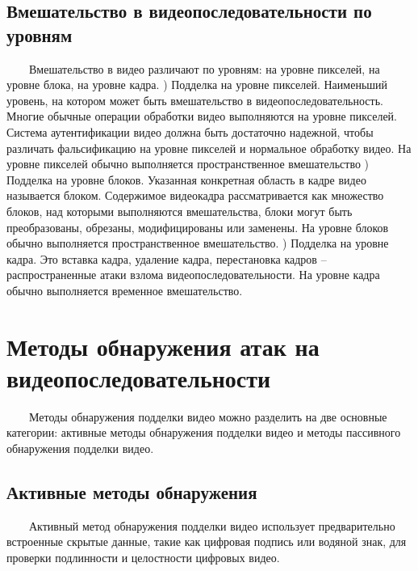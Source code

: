 \documentclass[12pt]{article}
\begin{document}
    \subsection{Вмешательство в видеопоследовательности по уровням}
        $\qquad$Вмешательство в видео различают по уровням: на уровне пикселей, на уровне блока, на уровне кадра.
        )      Подделка на уровне пикселей. Наименьший уровень, на котором может быть вмешательство в видеопоследовательность. Многие обычные операции обработки видео выполняются на уровне пикселей. Система аутентификации видео должна быть достаточно надежной, чтобы различать фальсификацию на уровне пикселей и нормальное обработку видео. На уровне пикселей обычно выполняется пространственное вмешательство
        )      Подделка на уровне блоков. Указанная конкретная область в кадре видео называется блоком. Содержимое видеокадра рассматривается как множество блоков, над которыми выполняются вмешательства, блоки могут быть преобразованы, обрезаны, модифицированы или заменены. На уровне блоков обычно выполняется пространственное вмешательство.
        )      Подделка на уровне кадра. Это вставка кадра, удаление кадра, перестановка кадров – распространенные атаки взлома видеопоследовательности. На уровне кадра обычно выполняется временное вмешательство.
    \section{Методы обнаружения атак на видеопоследовательности}
        $\qquad$Методы обнаружения подделки видео можно разделить на две основные категории: активные методы обнаружения подделки видео и методы пассивного обнаружения подделки видео.
        \newline
    \subsection{Активные методы обнаружения}
        $\qquad$Активный метод обнаружения подделки видео использует предварительно встроенные скрытые данные, такие как цифровая подпись или водяной знак, для проверки подлинности и целостности цифровых видео.
        
        
\end{document}
